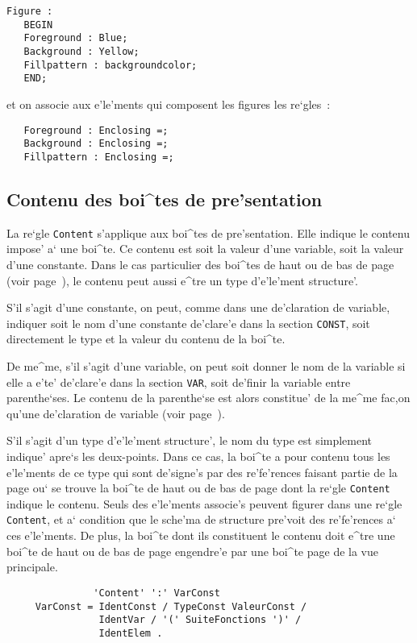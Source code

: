{\begin{example}
\begin{verbatim}
Figure :
   BEGIN
   Foreground : Blue;
   Background : Yellow;
   Fillpattern : backgroundcolor;
   END;
\end{verbatim}
et on associe aux e'le'ments qui composent les figures les re`gles~:
\begin{verbatim}
   Foreground : Enclosing =;
   Background : Enclosing =;
   Fillpattern : Enclosing =;
\end{verbatim}
\end{example}

\subsection{Contenu des boi^tes de pre'sentation}
\label{content}

La re`gle {\tt Content} s'applique aux boi^tes de pre'sentation.
Elle indique le contenu impose' a` une boi^te. Ce contenu est soit
la valeur d'une variable, soit la valeur d'une constante.
Dans le cas particulier des boi^tes de haut ou de bas de page (voir
page~\pageref{page}), le contenu peut aussi e^tre un type d'e'le'ment
structure'.

S'il s'agit d'une constante, on peut, comme dans une de'claration de variable,
indiquer soit le nom d'une constante de'clare'e dans la section {\tt CONST},
soit directement le type et la valeur du contenu de la boi^te.

De me^me, s'il s'agit d'une variable, on peut soit donner le nom de la
variable si elle a e'te' de'clare'e dans la section {\tt VAR},
soit de'finir la variable entre parenthe`ses. Le contenu de la
parenthe`se est alors constitue' de la me^me fac,on qu'une de'claration
de variable (voir page~\pageref{variables}).

S'il s'agit d'un type d'e'le'ment structure', le nom du type est simplement
indique' apre`s les deux-points. Dans ce cas, la boi^te a pour contenu tous
les e'le'ments de ce type qui sont de'signe's par des re'fe'rences faisant
partie de la page ou` se trouve la boi^te de haut ou de bas de page dont la
re`gle {\tt Content} indique le contenu.
Seuls des e'le'ments associe's peuvent figurer dans une re`gle {\tt Content},
et a` condition que le sche'ma de structure pre'voit des re'fe'rences a`
ces e'le'ments. De plus, la boi^te dont ils constituent le contenu doit e^tre
une boi^te de haut ou de bas de page engendre'e par une boi^te page de la
vue principale.

\begin{verbatim}
               'Content' ':' VarConst
     VarConst = IdentConst / TypeConst ValeurConst /
                IdentVar / '(' SuiteFonctions ')' /
                IdentElem .
\end{verbatim}

}

